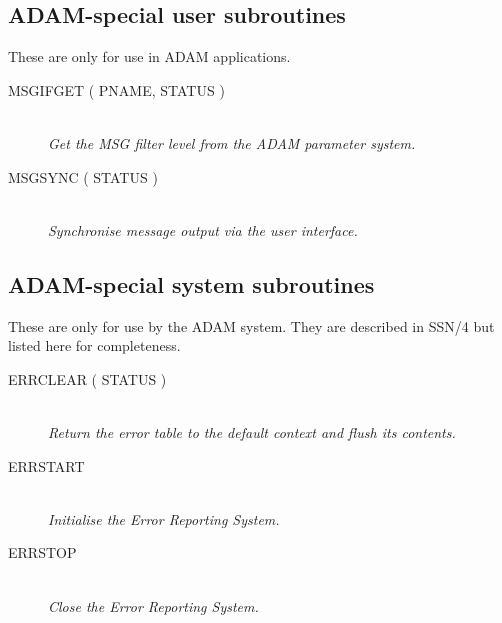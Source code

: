 \documentclass[twoside,11pt]{article}
\newcommand{\htmlref}[2]{#1}
\newcommand{\xref}[3]{#1}
\newcommand{\xlabel}[1]{}
\renewcommand{\_}{\texttt{\symbol{95}}}
\newcommand{\listline}{\hspace{1pt}\\}
\newcommand{\listline}{}
\begin{document}
\subsection{\xlabel{adam_special_user_subroutines}ADAM-special user subroutines}
These are only for use in ADAM applications.
\begin {description}
\item [\htmlref{MSG\_IFGET}{MSG_IFGET} ( PNAME, STATUS )] \listline 
\textit{ Get the MSG filter level from the ADAM parameter system.}
\item [\htmlref{MSG\_SYNC}{MSG_SYNC} ( STATUS )] \listline 
\textit{ Synchronise message output via the user interface.}
\end{description}

\subsection{\xlabel{adam_special_system_subroutines}ADAM-special system subroutines}
These are only for use by the ADAM system. They are described in
\xref{SSN/4}{ssn4}{routines_specific_to_the_adam_fixed_part}
but listed here for completeness.
\begin {description}
\item [\xref{ERR\_CLEAR}{ssn4}{ERR_CLEAR} ( STATUS )] \listline 
\textit{ Return the error table to the default context and flush its contents.}
\item [\xref{ERR\_START}{ssn4}{ERR_START}] \listline 
\textit{ Initialise the Error Reporting System.}
\item [\xref{ERR\_STOP}{ssn4}{ERR_STOP}] \listline 
\textit{ Close the Error Reporting System.}
\end{description}

\newpage
\end{document}

